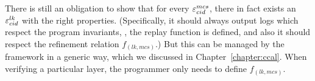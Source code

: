 There is still an obligation to show that for every ${\varepsilon}^{mcs}_{cid}$, there
in fact exists an ${\varepsilon}^{lk}_{cid}$ with the right
properties. (Specifically, it should always output logs which
respect the program invariants, \ie, the replay function is defined,
and also it should respect the refinement relation $f_{(lk, mcs)}$.) But this can
be managed by the framework in a generic way, which we discussed in Chapter~\ref{chapter:ccal}. When
verifying a particular layer, the programmer only needs to define $f_{(lk, mcs)}$.

